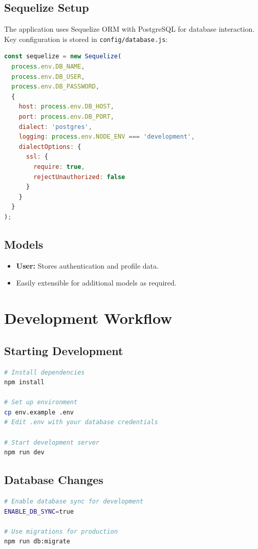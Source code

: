\subsection{Sequelize Setup}
The application uses Sequelize ORM with PostgreSQL for database interaction. 
Key configuration is stored in \texttt{config/database.js}:

\begin{lstlisting}[language=JavaScript, caption=Sequelize Configuration]
const sequelize = new Sequelize(
  process.env.DB_NAME,
  process.env.DB_USER,
  process.env.DB_PASSWORD,
  {
    host: process.env.DB_HOST,
    port: process.env.DB_PORT,
    dialect: 'postgres',
    logging: process.env.NODE_ENV === 'development',
    dialectOptions: {
      ssl: {
        require: true,
        rejectUnauthorized: false
      }
    }
  }
);
\end{lstlisting}

\subsection{Models}
\begin{itemize}
    \item \textbf{User:} Stores authentication and profile data.
    \item Easily extensible for additional models as required.
\end{itemize}

\section{Development Workflow}

\subsection{Starting Development}
\begin{lstlisting}[language=bash]
# Install dependencies
npm install

# Set up environment
cp env.example .env
# Edit .env with your database credentials

# Start development server
npm run dev
\end{lstlisting}

\subsection{Database Changes}
\begin{lstlisting}[language=bash]
# Enable database sync for development
ENABLE_DB_SYNC=true

# Use migrations for production
npm run db:migrate
\end{lstlisting}

